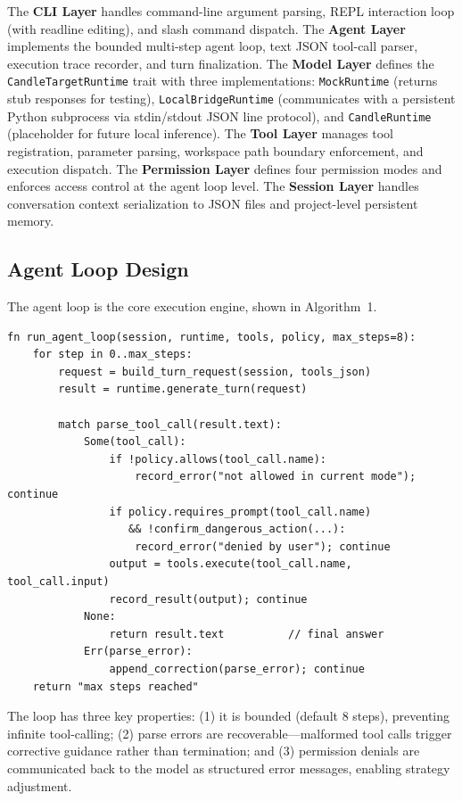 \documentclass[11pt]{article}
\begin{document}
The \textbf{CLI Layer} handles command-line argument parsing, REPL interaction loop (with readline editing), and slash command dispatch. The \textbf{Agent Layer} implements the bounded multi-step agent loop, text JSON tool-call parser, execution trace recorder, and turn finalization. The \textbf{Model Layer} defines the \texttt{CandleTargetRuntime} trait with three implementations: \texttt{MockRuntime} (returns stub responses for testing), \texttt{LocalBridgeRuntime} (communicates with a persistent Python subprocess via stdin/stdout JSON line protocol), and \texttt{CandleRuntime} (placeholder for future local inference). The \textbf{Tool Layer} manages tool registration, parameter parsing, workspace path boundary enforcement, and execution dispatch. The \textbf{Permission Layer} defines four permission modes and enforces access control at the agent loop level. The \textbf{Session Layer} handles conversation context serialization to JSON files and project-level persistent memory.

\subsection{Agent Loop Design}

The agent loop is the core execution engine, shown in Algorithm~1.

\begin{lstlisting}[caption={Agent loop (simplified Rust pseudocode)}, label={alg:loop}]
fn run_agent_loop(session, runtime, tools, policy, max_steps=8):
    for step in 0..max_steps:
        request = build_turn_request(session, tools_json)
        result = runtime.generate_turn(request)

        match parse_tool_call(result.text):
            Some(tool_call):
                if !policy.allows(tool_call.name):
                    record_error("not allowed in current mode"); continue
                if policy.requires_prompt(tool_call.name)
                   && !confirm_dangerous_action(...):
                    record_error("denied by user"); continue
                output = tools.execute(tool_call.name, tool_call.input)
                record_result(output); continue
            None:
                return result.text          // final answer
            Err(parse_error):
                append_correction(parse_error); continue
    return "max steps reached"
\end{lstlisting}

The loop has three key properties: (1) it is bounded (default 8 steps), preventing infinite tool-calling; (2) parse errors are recoverable---malformed tool calls trigger corrective guidance rather than termination; and (3) permission denials are communicated back to the model as structured error messages, enabling strategy adjustment.
\end{document}
